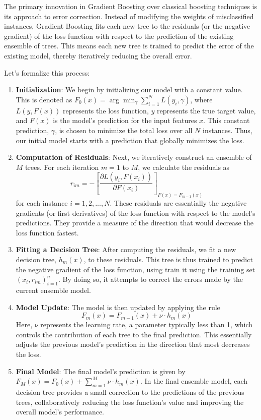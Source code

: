 The primary innovation in Gradient Boosting over classical boosting techniques is its approach to error correction. Instead of modifying the weights of misclassified instances, Gradient Boosting fits each new tree to the residuals (or the negative gradient) of the loss function with respect to the prediction of the existing ensemble of trees. This means each new tree is trained to predict the error of the existing model, thereby iteratively reducing the overall error.

Let's formalize this process:

\begin{enumerate}
	\item \textbf{Initialization}: We begin by initializing our model with a constant value. This is denoted as $F_0(x) = \arg\min_{\gamma} \sum_{i=1}^{N} L(y_i, \gamma)$, where $L(y, F(x))$ represents the loss function, $y$ represents the true target value, and $F(x)$ is the model's prediction for the input features $x$. This constant prediction, $\gamma$, is chosen to minimize the total loss over all $N$ instances. Thus, our initial model starts with a prediction that globally minimizes the loss.
	\item \textbf{Computation of Residuals}: Next, we iteratively construct an ensemble of $M$ trees. For each iteration $m=1$ to $M$, we calculate the residuals as
	\begin{equation}
		r_{im} = - \left[\frac{\partial L(y_i, F(x_i))}{\partial F(x_i)}\right]_{F(x)=F_{m-1}(x)}
	\end{equation} 
 	for each instance $i=1,2,...,N$. These residuals are essentially the negative gradients (or first derivatives) of the loss function with respect to the model's predictions. They provide a measure of the direction that would decrease the loss function fastest.
	\item \textbf{Fitting a Decision Tree}: After computing the residuals, we fit a new decision tree, $h_m(x)$, to these residuals. This tree is thus trained to predict the negative gradient of the loss function, using train it using the training set 
	${(x_i, r_{im})}_{i=1}^n$. By doing so, it attempts to correct the errors made by the current ensemble model.
	\item \textbf{Model Update}: The model is then updated by applying the rule
	\begin{equation}
		F_m(x) = F_{m-1}(x) + \nu \cdot h_m(x)
	\end{equation}
 	Here, $\nu$ represents the learning rate, a parameter typically less than 1, which controls the contribution of each tree to the final prediction. This essentially adjusts the previous model's prediction in the direction that most decreases the loss.
	\item \textbf{Final Model}: The final model's prediction is given by $F_M(x) = F_0(x) + \sum_{m=1}^{M} \nu \cdot h_m(x)$. In the final ensemble model, each decision tree provides a small correction to the predictions of the previous trees, collaboratively reducing the loss function's value and improving the overall model's performance.
\end{enumerate}


